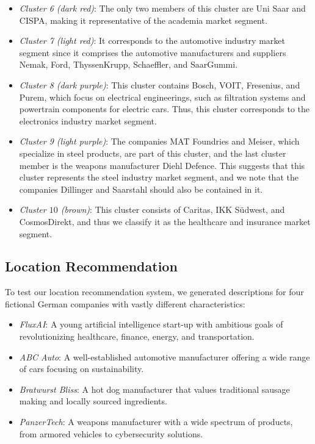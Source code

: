 \documentclass[conference]{IEEEtran}
\begin{document}
\begin{itemize}
    \item \textit{Cluster 6 (dark red)}: The only two members of this cluster are Uni Saar and CISPA, making it representative of the academia market segment.

    \item \textit{Cluster 7 (light red)}: It corresponds to the automotive industry market segment since it comprises the automotive manufacturers and suppliers Nemak, Ford, ThyssenKrupp, Schaeffler, and SaarGummi.

    \item \textit{Cluster 8 (dark purple)}: This cluster contains Bosch, VOIT, Fresenius, and Purem, which focus on electrical engineerings, such as filtration systems and powertrain components for electric cars. Thus, this cluster corresponds to the electronics industry market segment.

    \item \textit{Cluster 9 (light purple)}: The companies MAT Foundries and Meiser, which specialize in steel products, are part of this cluster, and the last cluster member is the weapons manufacturer Diehl Defence. This suggests that this cluster represents the steel industry market segment, and we note that the companies Dillinger and Saarstahl should also be contained in it.

    \item \textit{Cluster $10$ (brown)}: This cluster consists of Caritas, IKK Südwest, and CosmosDirekt, and thus we classify it as the healthcare and insurance market segment.
\end{itemize}

\subsection{Location Recommendation}
To test our location recommendation system, we generated descriptions for four fictional German companies with vastly different characteristics:
\begin{itemize}
    \item \textit{FluxAI}: A young artificial intelligence start-up with ambitious goals of revolutionizing healthcare, finance, energy, and transportation.
    \item \textit{ABC Auto}: A well-established automotive manufacturer offering a wide range of cars focusing on sustainability.
    \item \textit{Bratwurst Bliss}: A hot dog manufacturer that values traditional sausage making and locally sourced ingredients.
    \item \textit{PanzerTech}: A weapons manufacturer with a wide spectrum of products, from armored vehicles to cybersecurity solutions.
\end{itemize}
\end{document}
